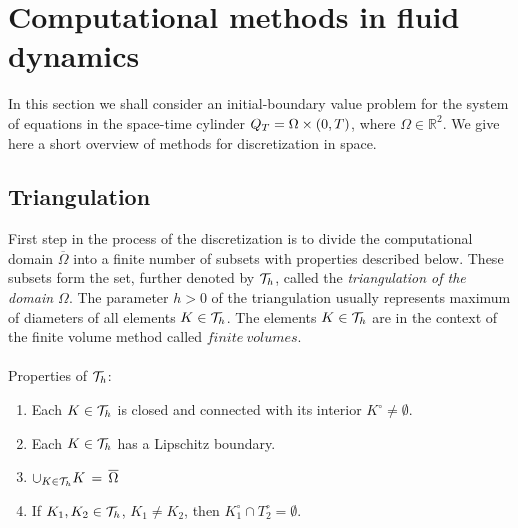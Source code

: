 \chapter{Computational methods in fluid dynamics}
  In this section we shall consider an initial-boundary value problem for the system of equations in the space-time cylinder $Q_T = \Omega \times \left( 0, T \right)$, where $\Omega\in\mathbb{R}^2$.
We give here a short overview of methods for discretization in space.
	\section{Triangulation}
			  First step in the process of the discretization is to divide the computational domain $\overline{\Omega}$ into a finite number of subsets with properties described below. These subsets form the set, further denoted by $\mathcal{T}_h$, called the \textit{triangulation of the domain $\Omega$}. The parameter $h>0$ of the triangulation usually represents maximum of diameters of all elements $K\in\mathcal{T}_h$. The elements $K\in\mathcal{T}_h$ are in the context of the finite volume method called $finite\ volumes$.
		  \\\ \\Properties of $\mathcal{T}_h$:
		  \begin{enumerate}
		  \item Each $K\in\mathcal{T}_h$ is closed and connected with its interior $K^{\circ}\neq\emptyset$.
		  \item Each $K\in\mathcal{T}_h$ has a Lipschitz boundary.
		  \item$\cup_{K\in\mathcal{T}_h}K\,=\,\overline{\Omega}$
		  \item If $K_1,K_2\in\mathcal{T}_h$, $K_1\neq{K_2}$, then $K_1^{\circ}\cap{T}_2^{\circ} = \emptyset$.
		  \end{enumerate}
